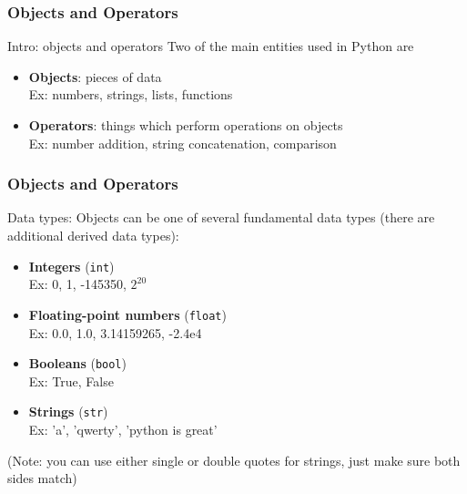 \documentclass{beamer}
\newcommand{\code}[1]{\texttt{#1}}
\begin{document}
\begin{frame}	
\end{frame}

\begin{frame}%
	\frametitle{Objects and Operators}
	
	\begin{alertblock}{Intro: objects and operators}
			Two of the main entities used in Python are
			\begin{itemize}
				\item \textbf{Objects}: pieces of data \\
						Ex: numbers, strings, lists, functions
				\item \textbf{Operators}: things which perform operations on objects \\
						Ex: number addition, string concatenation, comparison
			\end{itemize}
	\end{alertblock}
	
\end{frame}

\begin{frame}%
	\frametitle{Objects and Operators}
	
	\begin{alertblock}{Data types:}
			Objects can be one of several fundamental data types (there are additional derived data types):
			\begin{itemize}
				\item \textbf{Integers} (\code{int}) \\
						Ex: 0, 1, -145350, $2^{20}$
				\item \textbf{Floating-point numbers} (\code{float}) \\
						Ex: 0.0, 1.0, 3.14159265, -2.4e4
				\item \textbf{Booleans} (\code{bool}) \\
						Ex: True, False
				\item \textbf{Strings} (\code{str}) \\
						Ex: 'a', 'qwerty', 'python is great'
			\end{itemize}
			(Note: you can use either single or double quotes for strings, just make sure both sides match)
	\end{alertblock}
	
\end{frame}
\end{document}
